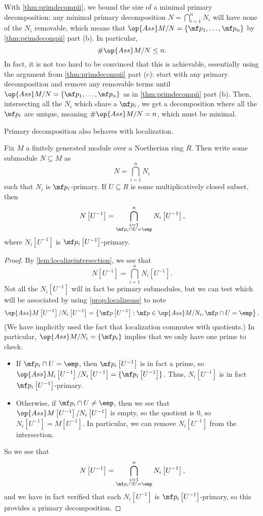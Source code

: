 \begin{remark}[Nir] \label{rem:findminimalprimdecomp}
	With \autoref{thm:primdecompii}, we bound the size of a minimal primary decomposition: any minimal primary decomposition $N=\bigcap_{i=1}^nN_i$ will have none of the $N_i$ removable, which means that $\op{Ass}M/N=\{\mf p_1,\ldots,\mf p_n\}$ by \autoref{thm:primdecompii} part (b). In particular,
	\[\#\op{Ass}M/N\le n.\]
	In fact, it is not too hard to be convinced that this is achievable, essentially using the argument from \autoref{thm:primdecompii} part (c): start with any primary decomposition and remove any removable terms until $\op{Ass}M/N=\{\mf p_1,\ldots,\mf p_n\}$ as in \autoref{thm:primdecompii} part (b). Then, intersecting all the $N_i$ which share a $\mf p_i$, we get a decomposition where all the $\mf p_i$ are unique, meaning $\#\op{Ass}M/N=n$, which must be minimal.
\end{remark}
Primary decomposition also behaves with localization.
\begin{theorem}
	Fix $M$ a finitely generated module over a Noetherian ring $R$. Then write some submodule $N\subseteq M$ as
	\[N=\bigcap_{i=1}^nN_i\]
	such that $N_i$ is $\mf p_i$-primary. If $U\subseteq R$ is some multiplicatively closed subset, then
	\[N\left[U^{-1}\right]=\bigcap_{\substack{i=1\\\mf p_i\cap U=\emp}}^nN_i\left[U^{-1}\right],\]
	where $N_i\left[U^{-1}\right]$ is $\mf p_i\left[U^{-1}\right]$-primary.
\end{theorem}
\begin{proof}
	By \autoref{lem:localizeintersection}, we see that
	\[N\left[U^{-1}\right]=\bigcap_{i=1}^nN_i\left[U^{-1}\right].\]
	Not all the $N_i\left[U^{-1}\right]$ will in fact be primary submodules, but we can test which will be associated by using \autoref{prop:localizeass} to note
	\[\op{Ass}M\left[U^{-1}\right]/N_i\left[U^{-1}\right]=\left\{\mf p\left[U^{-1}\right]:\mf p\in\op{Ass}M/N_i,\mf p\cap U=\emp\right\}.\]
	(We have implicitly used the fact that localization commutes with quotients.) In particular, $\op{Ass}M/N_i=\{\mf p_i\}$ implies that we only have one prime to check.
	\begin{itemize}
		\item If $\mf p_i\cap U=\emp$, then $\mf p_i\left[U^{-1}\right]$ is in fact a prime, so $\op{Ass}M_i\left[U^{-1}\right]/N_i\left[U^{-1}\right]=\{\mf p_i\left[U^{-1}\right]\}$. Thus, $N_i\left[U^{-1}\right]$ is in fact $\mf p_i\left[U^{-1}\right]$-primary.
		\item Otherwise, if $\mf p_i\cap U\ne\emp$, then we see that $\op{Ass}M\left[U^{-1}\right]/N_i\left[U^{-1}\right]$ is empty, so the quotient is $0$, so $N_i\left[U^{-1}\right]=M\left[U^{-1}\right]$. In particular, we can remove $N_i\left[U^{-1}\right]$ from the intersection.
	\end{itemize}
	So we see that
	\[N\left[U^{-1}\right]=\bigcap_{\substack{i=1\\\mf p_i\cap U=\emp}}^nN_i\left[U^{-1}\right],\]
	and we have in fact verified that each $N_i\left[U^{-1}\right]$ is $\mf p_i\left[U^{-1}\right]$-primary, so this provides a primary decomposition.
\end{proof}

